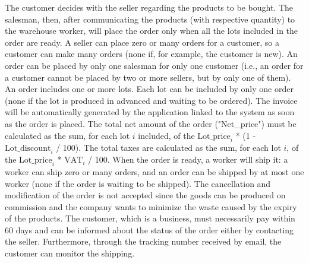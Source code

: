 The customer decides with the seller regarding the products to be bought. The salesman, then, after communicating the products (with respective quantity) to the warehouse worker, will place the order only when all the lots included in the order are ready. A seller can place zero or many orders for a customer, so a customer can make many orders (none if, for example, the customer is new). An order can be placed by only one salesman for only one customer (i.e., an order for a customer cannot be placed by two or more sellers, but by only one of them). An order includes one or more lots. Each lot can be included by only one order (none if the lot is produced in advanced and waiting to be ordered). The invoice will be automatically generated by the application linked to the system as soon as the order is placed. The total net amount of the order ("Net\_price") must be calculated as the sum, for each lot $i$ included, of the $ \mathrm{Lot\_price}_i $ * (1 - $ \mathrm{Lot\_discount}_i $ / 100). The total taxes are calculated as the sum, for each lot $i$, of the $ \mathrm{Lot\_price}_i $ * $ \mathrm{VAT}_i $ / 100.
When the order is ready, a worker will ship it: a worker can ship zero or many orders, and an order can be shipped by at most one worker (none if the order is waiting to be shipped). The cancellation and modification of the order is not accepted since the goods can be produced on commission and the company wants to minimize the waste caused by the expiry of the products. The customer, which is a business, must necessarily pay within 60 days and can be informed about the status of the order either by contacting the seller. Furthermore, through the tracking number received by email, the customer can monitor the shipping.
